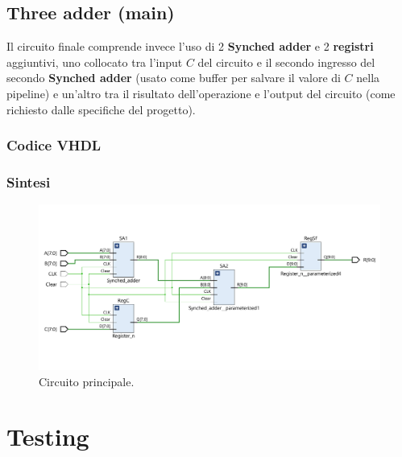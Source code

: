 \documentclass[12pt]{article}
\begin{document}
    \subsection{Three adder (main)}
        Il circuito finale comprende invece l'uso di 2 \textbf{Synched adder} e 2 \textbf{registri} aggiuntivi, uno collocato tra l'input $C$ del circuito e il secondo ingresso del secondo \textbf{Synched adder} (usato come buffer per salvare il valore di $C$ nella pipeline) e un'altro tra il risultato dell'operazione e l'output del circuito (come richiesto dalle specifiche del progetto).

        \subsubsection{Codice VHDL}
            
        \newpage
        
        \subsubsection{Sintesi}
            \begin{figure}[ht]
                \centering
                \includegraphics[scale=0.55]{main.png}
                \caption{Circuito principale.}
            \end{figure}
        \newpage
        
\section{Testing}
\end{document}
